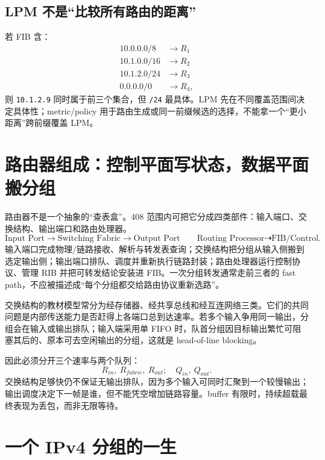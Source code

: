 \documentclass[11pt,a4paper]{ctexart}
\newcommand{\code}[1]{\texttt{#1}}
\begin{document}
\subsection{LPM 不是“比较所有路由的距离”}

若 FIB 含：
\[
\begin{array}{ll}
10.0.0.0/8 & \to R_1\\
10.1.0.0/16 & \to R_2\\
10.1.2.0/24 & \to R_3\\
0.0.0.0/0 & \to R_4,
\end{array}
\]
则 \code{10.1.2.9} 同时属于前三个集合，但 \code{/24} 最具体。LPM 先在不同覆盖范围间决定具体性；metric/policy 用于路由生成或同一前缀候选的选择，不能拿一个“更小距离”跨前缀覆盖 LPM。

\section{路由器组成：控制平面写状态，数据平面搬分组}

路由器不是一个抽象的“查表盒”。408 范围内可把它分成四类部件：输入端口、交换结构、输出端口和路由处理器。
\[
\boxed{
\text{Input Port}\to\text{Switching Fabric}\to\text{Output Port}
}
\qquad
\boxed{
\text{Routing Processor}\dashrightarrow\text{FIB/Control}
}.
\]
输入端口完成物理/链路接收、解析与转发表查询；交换结构把分组从输入侧搬到选定输出侧；输出端口排队、调度并重新执行链路封装；路由处理器运行控制协议、管理 RIB 并把可转发结论安装进 FIB。一次分组转发通常走前三者的 fast path，不应被描述成“每个分组都交给路由协议重新选路”。

交换结构的教材模型常分为经存储器、经共享总线和经互连网络三类。它们的共同问题是内部传送能力是否赶得上各端口总到达速率。若多个输入争用同一输出，分组会在输入或输出排队；输入端采用单 FIFO 时，队首分组因目标输出繁忙可阻塞其后的、原本可去空闲输出的分组，这就是 head-of-line blocking。

因此必须分开三个速率与两个队列：
\[
\boxed{R_{in},\ R_{fabric},\ R_{out};\quad Q_{in},\ Q_{out}}.
\]
交换结构足够快仍不保证无输出排队，因为多个输入可同时汇聚到一个较慢输出；输出调度决定下一帧是谁，但不能凭空增加链路容量。buffer 有限时，持续超载最终表现为丢包，而非无限等待。

\section{一个 IPv4 分组的一生}
\end{document}
